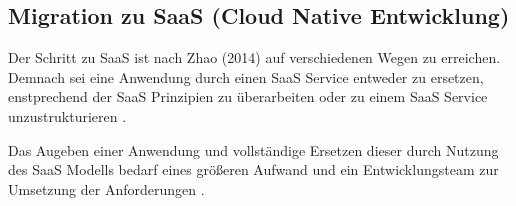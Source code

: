 \subsection{Migration zu SaaS (Cloud Native Entwicklung)}
Der Schritt zu \ac{SaaS} ist nach Zhao (2014) auf verschiedenen Wegen zu erreichen. Demnach sei eine Anwendung durch einen SaaS Service entweder zu ersetzen,
enstprechend der SaaS Prinzipien zu überarbeiten oder zu einem \ac{SaaS} Service unzustrukturieren \cite[Vgl.][S. 144]{Zhao2014}.

Das Augeben einer Anwendung und vollständige Ersetzen dieser durch Nutzung des \ac{SaaS} Modells bedarf eines
größeren Aufwand und ein Entwicklungsteam zur Umsetzung der Anforderungen \cite[Vgl.][]{CIO}.